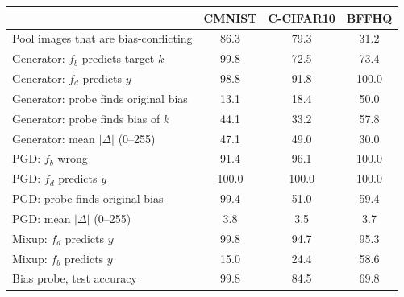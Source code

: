 \begin{tabular}{lccc}
\toprule
 & CMNIST & C-CIFAR10 & BFFHQ \\
\midrule
Pool images that are bias-conflicting & 86.3 & 79.3 & 31.2 \\
Generator: $f_b$ predicts target $k$ & 99.8 & 72.5 & 73.4 \\
Generator: $f_d$ predicts $y$ & 98.8 & 91.8 & 100.0 \\
Generator: probe finds original bias & 13.1 & 18.4 & 50.0 \\
Generator: probe finds bias of $k$ & 44.1 & 33.2 & 57.8 \\
Generator: mean $|\Delta|$ (0--255) & 47.1 & 49.0 & 30.0 \\
PGD: $f_b$ wrong & 91.4 & 96.1 & 100.0 \\
PGD: $f_d$ predicts $y$ & 100.0 & 100.0 & 100.0 \\
PGD: probe finds original bias & 99.4 & 51.0 & 59.4 \\
PGD: mean $|\Delta|$ (0--255) & 3.8 & 3.5 & 3.7 \\
Mixup: $f_d$ predicts $y$ & 99.8 & 94.7 & 95.3 \\
Mixup: $f_b$ predicts $y$ & 15.0 & 24.4 & 58.6 \\
\midrule
Bias probe, test accuracy & 99.8 & 84.5 & 69.8 \\
\bottomrule
\end{tabular}
